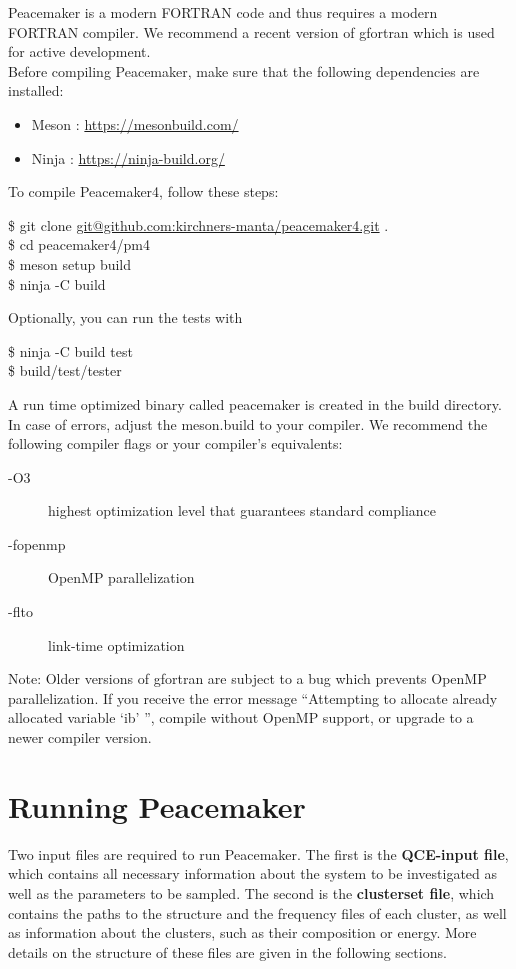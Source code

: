 \documentclass{scrartcl}
\begin{document}
Peacemaker is a modern FORTRAN code and thus requires a modern FORTRAN compiler.
We recommend a recent version of gfortran which is used for active development. \\
Before compiling Peacemaker, make sure that the following dependencies are installed:
\begin{itemize}
    \item Meson : \url{https://mesonbuild.com/}
    \item Ninja : \url{https://ninja-build.org/}
\end{itemize}
To compile Peacemaker4, follow these steps:
\begin{addmargin}[1cm]{0cm}
    \ttfamily
    \$ git clone
    \url{git@github.com:kirchners-manta/peacemaker4.git} .\\
    \$ cd peacemaker4/pm4 \\
    \$ meson setup build \\
    \$ ninja -C build 
\end{addmargin}
Optionally, you can run the tests with
\begin{addmargin}[1cm]{0cm}
    \ttfamily
    \$ ninja -C build test \\
    \$ build/test/tester
\end{addmargin}

A run time optimized binary called peacemaker is created in the build directory.
In case of errors, adjust the meson.build to your compiler.
We recommend the following compiler flags or your compiler's equivalents:
\begin{addmargin}[1cm]{0cm}
    \begin{description}
        \item[-O3] highest optimization level that guarantees standard compliance
        \item[-fopenmp] OpenMP parallelization
        \item[-flto] link-time optimization
    \end{description}
\end{addmargin}

Note: Older versions of gfortran are subject to a bug which prevents OpenMP parallelization.
If you receive the error message ``Attempting to allocate already allocated variable `ib' '', 
compile without OpenMP support, or upgrade to a newer compiler version.

\newpage
\section{Running Peacemaker}
Two input files are required to run Peacemaker.
The first is the \textbf{QCE-input file}, which contains all necessary information about the system 
to be investigated as well as the parameters to be sampled.
The second is the \textbf{clusterset file}, which contains the paths to the structure and the frequency 
files of each cluster, as well as information about the clusters, such as their composition or energy.
More details on the structure of these files are given in the following sections.
\end{document}
